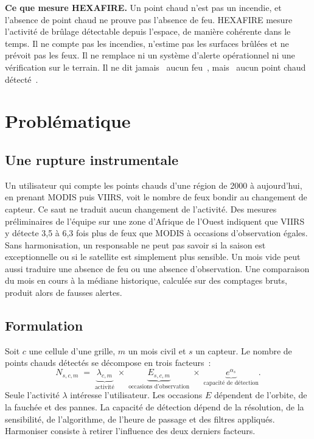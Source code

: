 \documentclass[11pt,a4paper]{article}
\newcommand{\og}{\guillemotleft~}
\newcommand{\fg}{~\guillemotright}
\begin{document}
\begin{tcolorbox}[colback=gray!5,colframe=gray!50,boxrule=0.5pt,arc=2pt]
\small\textbf{Ce que mesure HEXAFIRE.} Un point chaud n'est pas un incendie, et l'absence de point chaud ne prouve pas l'absence de feu. HEXAFIRE mesure l'activité de brûlage détectable depuis l'espace, de manière cohérente dans le temps. Il ne compte pas les incendies, n'estime pas les surfaces brûlées et ne prévoit pas les feux. Il ne remplace ni un système d'alerte opérationnel ni une vérification sur le terrain. Il ne dit jamais \og aucun feu\fg, mais \og aucun point chaud détecté\fg.
\end{tcolorbox}

\section{Problématique}\label{sec:probleme}

\subsection{Une rupture instrumentale}

Un utilisateur qui compte les points chauds d'une région de 2000 à aujourd'hui, en prenant MODIS puis VIIRS, voit le nombre de feux bondir au changement de capteur. Ce saut ne traduit aucun changement de l'activité. Des mesures préliminaires de l'équipe sur une zone d'Afrique de l'Ouest indiquent que VIIRS y détecte 3,5 à 6,3 fois plus de feux que MODIS à occasions d'observation égales. Sans harmonisation, un responsable ne peut pas savoir si la saison est exceptionnelle ou si le satellite est simplement plus sensible. Un mois vide peut aussi traduire une absence de feu ou une absence d'observation. Une comparaison du mois en cours à la médiane historique, calculée sur des comptages bruts, produit alors de fausses alertes.

\subsection{Formulation}

Soit $c$ une cellule d'une grille, $m$ un mois civil et $s$ un capteur. Le nombre de points chauds détectés se décompose en trois facteurs~:
\begin{equation}
  N_{s,c,m} \;=\; \underbrace{\lambda_{c,m}}_{\text{activité}} \;\times\; \underbrace{E_{s,c,m}}_{\text{occasions d'observation}} \;\times\; \underbrace{e^{\alpha_{s}}}_{\text{capacité de détection}}.
  \label{eq:decomp}
\end{equation}
Seule l'activité $\lambda$ intéresse l'utilisateur. Les occasions $E$ dépendent de l'orbite, de la fauchée et des pannes. La capacité de détection dépend de la résolution, de la sensibilité, de l'algorithme, de l'heure de passage et des filtres appliqués. Harmoniser consiste à retirer l'influence des deux derniers facteurs.
\end{document}
